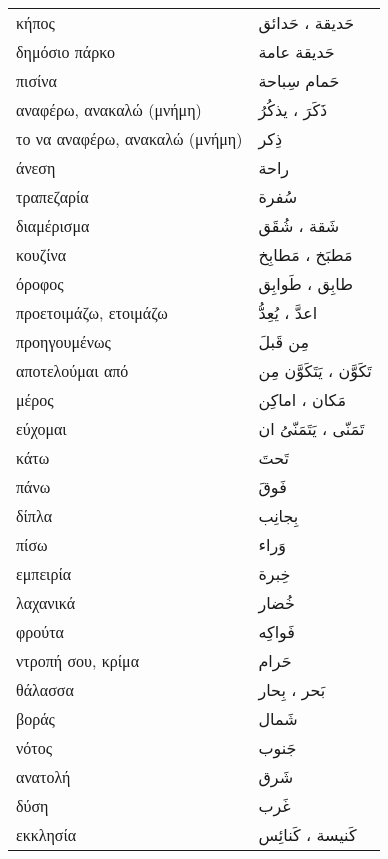 \documentclass[twocolumn,a4paper]{article}
\newcommand{\ar}[1]{\textarabic{#1}}
\newcommand{\pl}{\raisebox{0.15ex}{\footnotesize ◍}}
\newcommand{\vrf}{\raisebox{0.15ex}{\footnotesize ◉}}
\newcommand{\mas}{\raisebox{0.15ex}{\footnotesize ◫}}
\begin{document}
\begin{mpsupertabular}{ P{0.5\textwidth} P{0.5\textwidth} }
κήπος \pl                    & \ar{ حَديقة ، حَدائق } \\
δημόσιο πάρκο                & \ar{ حَديقة عامة } \\
πισίνα                       & \ar{ حَمام سِباحة } \\
αναφέρω, ανακαλώ (μνήμη) \vrf  & \ar{ ذَكَرَ ، يذكُرُ } \\ %
το να αναφέρω, ανακαλώ (μνήμη) \mas    & \ar{ ذِكر } \\
άνεση                        & \ar{ راحة } \\
τραπεζαρία                   & \ar{ سُفرة } \\
διαμέρισμα \pl               & \ar{ شَقة ، شُقَق} \\
κουζίνα \pl                  & \ar{ مَطبَخ ، مَطابِخ } \\
όροφος \pl                   & \ar{ طابِق ، طَوابِق } \\
προετοιμάζω, ετοιμάζω \vrf   & \ar{ اعدَّ ، يُعِدُّ } \\ %
προηγουμένως                 & \ar{ مِن قَبلَ } \\
αποτελούμαι από \vrf         & \ar{ تَكَوَّن ، يَتَكَوَّن مِن } \\ %
μέρος \pl                    & \ar{ مَكان ، اماكِن } \\
εύχομαι \vrf                 & \ar{ تَمَنّى ، يَتَمَنّىُ ان } \\ %
κάτω                         & \ar{ تَحتَ } \\
πάνω                         & \ar{ فَوقَ } \\
δίπλα                        & \ar{ بِجانِب } \\
πίσω                         & \ar{ وَراء } \\
εμπειρία                     & \ar{ خِبرة } \\
λαχανικά                     & \ar{ خُضار } \\
φρούτα                       & \ar{ فَواكِه } \\
ντροπή σου, κρίμα            & \ar{ حَرام } \\
θάλασσα \pl                  & \ar{ بَحر ، بِحار } \\
βοράς                        & \ar{ شَمال } \\
νότος                        & \ar{ جَنوب } \\
ανατολή                      & \ar{ شَرق } \\
δύση                         & \ar{ غَرب } \\
εκκλησία \pl                 & \ar{ كَنيسة ، كَنائِس } \\


\end{mpsupertabular}
\end{document}
